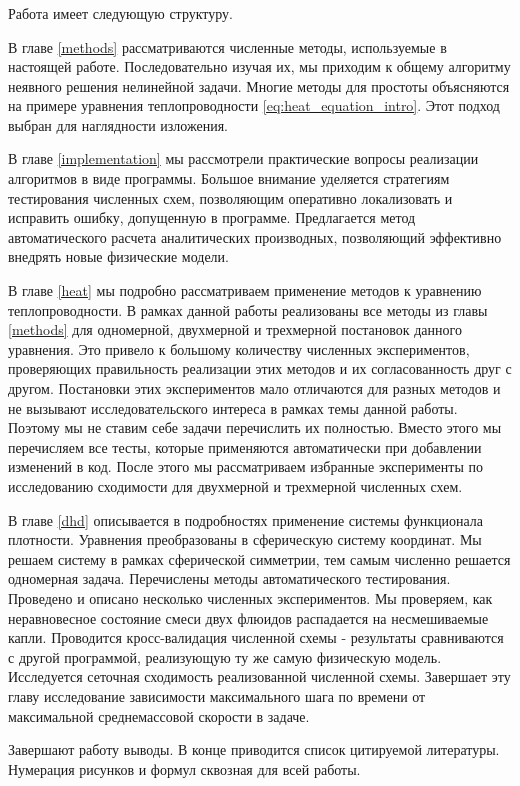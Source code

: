 \documentclass[a4paper,12pt]{article}
\begin{document}
\subsubsection*{}
Работа имеет следующую структуру. 
\par
В главе \ref{methods} рассматриваются численные методы, используемые в настоящей работе. Последовательно изучая их, мы приходим к общему алгоритму неявного решения нелинейной задачи. Многие методы для простоты объясняются на примере уравнения теплопроводности \eqref{eq:heat_equation_intro}. Этот подход выбран для наглядности изложения.
\par 
В главе \ref{implementation} мы рассмотрели практические вопросы реализации алгоритмов в виде программы. Большое внимание уделяется стратегиям тестирования численных схем, позволяющим оперативно локализовать и исправить ошибку, допущенную в программе. Предлагается метод автоматического расчета аналитических производных, позволяющий эффективно внедрять новые физические модели. 
\par
В главе \ref{heat} мы подробно рассматриваем применение методов к уравнению теплопроводности. В рамках данной работы реализованы все методы из главы \ref{methods} для одномерной, двухмерной и трехмерной постановок данного уравнения. Это привело к большому количеству численных экспериментов, проверяющих правильность реализации этих методов и их согласованность друг с другом. Постановки этих экспериментов мало отличаются для разных методов и не вызывают исследовательского интереса в рамках темы данной работы. Поэтому мы не ставим себе задачи перечислить их полностью. Вместо этого мы перечисляем все тесты, которые применяются автоматически при добавлении изменений в код. После этого мы рассматриваем избранные эксперименты по исследованию сходимости для двухмерной и трехмерной численных схем. 
\par
В главе \ref{dhd} описывается в подробностях применение системы функционала плотности. Уравнения преобразованы в сферическую систему координат. Мы решаем систему в рамках сферической симметрии, тем самым численно решается одномерная задача. Перечислены методы автоматического тестирования. Проведено и описано несколько численных экспериментов. Мы проверяем, как неравновесное состояние смеси двух флюидов распадается на несмешиваемые капли. Проводится кросс-валидация численной схемы - результаты сравниваются с другой программой, реализующую ту же самую физическую модель. Исследуется сеточная сходимость реализованной численной схемы. Завершает эту главу исследование зависимости максимального шага по времени от максимальной среднемассовой скорости в задаче.
\par
Завершают работу выводы. В конце приводится список цитируемой литературы. Нумерация рисунков и формул сквозная для всей работы. 
\end{document}
